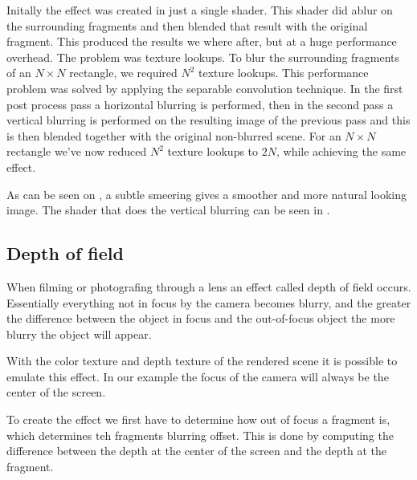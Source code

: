 Initally the effect was created in just a single shader. This shader
did ablur on the surrounding fragments and then blended that result
with the original fragment. This produced the results we where after,
but at a huge performance overhead. The problem was texture
lookups. To blur the surrounding fragments of an $N \times N$
rectangle, we required $N^2$ texture lookups. This performance problem
was solved by applying the separable convolution technique. In the
first post process pass a horizontal blurring is performed, then in
the second pass a vertical blurring is performed on the resulting
image of the previous pass and this is then blended together with the
original non-blurred scene. For an $N \times N$ rectangle we've now
reduced $N^2$ texture lookups to $2N$, while achieving the same
effect.


As can be seen on , a subtle smeering gives a
smoother and more natural looking image. The shader that does the
vertical blurring can be seen in .




\subsection{Depth of field}

When filming or photografing through a lens an effect called depth of
field occurs. Essentially everything not in focus by the camera
becomes blurry, and the greater the difference between the object in
focus and the out-of-focus object the more blurry the object will
appear.

With the color texture and depth texture of the rendered scene it is
possible to emulate this effect. In our example the focus of the
camera will always be the center of the screen.

To create the effect we first have to determine how out of focus a
fragment is, which determines teh fragments blurring offset. This is
done by computing the difference between the depth at the center of
the screen and the depth at the fragment.

